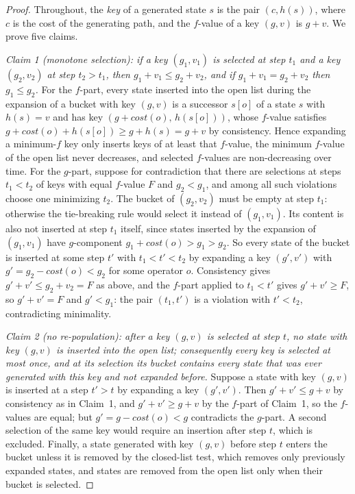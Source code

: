 \documentclass[letterpaper]{article}
\newcommand{\cost}{\ensuremath{\mathit{cost}}}
\theoremstyle{plain}
\theoremstyle{definition}
\theoremstyle{remark}
\begin{document}
\begin{proof}
Throughout, the \emph{key} of a generated state $s$ is the pair
$(c, h(s))$, where $c$ is the cost of the generating path, and the
$f$-value of a key $(g,v)$ is $g + v$. We prove five claims.

\emph{Claim 1 (monotone selection): if a key $(g_1,v_1)$ is selected at
step $t_1$ and a key $(g_2,v_2)$ at step $t_2 > t_1$, then
$g_1 + v_1 \leq g_2 + v_2$, and if $g_1 + v_1 = g_2 + v_2$ then
$g_1 \leq g_2$.}
For the $f$-part, every state inserted into the open list during the
expansion of a bucket with key $(g,v)$ is a successor $s[o]$ of a state
$s$ with $h(s) = v$ and has key $(g + \cost(o),\, h(s[o]))$, whose
$f$-value satisfies
$g + \cost(o) + h(s[o]) \geq g + h(s) = g + v$ by consistency. Hence
expanding a minimum-$f$ key only inserts keys of at least that
$f$-value, the minimum $f$-value of the open list never decreases, and
selected $f$-values are non-decreasing over time. For the $g$-part,
suppose for contradiction that there are selections at steps
$t_1 < t_2$ of keys with equal $f$-value $F$ and $g_2 < g_1$, and among
all such violations choose one minimizing $t_2$. The bucket of
$(g_2,v_2)$ must be empty at step $t_1$: otherwise the tie-breaking
rule would select it instead of $(g_1,v_1)$. Its content is also not
inserted at step $t_1$ itself, since states inserted by the expansion
of $(g_1,v_1)$ have $g$-component $g_1 + \cost(o) > g_1 > g_2$. So
every state of the bucket is inserted at some step $t'$ with
$t_1 < t' < t_2$ by expanding a key $(g',v')$ with
$g' = g_2 - \cost(o) < g_2$ for some operator $o$. Consistency gives
$g' + v' \leq g_2 + v_2 = F$ as above, and the $f$-part applied to
$t_1 < t'$ gives $g' + v' \geq F$, so $g' + v' = F$ and $g' < g_1$:
the pair $(t_1, t')$ is a violation with $t' < t_2$, contradicting
minimality.

\emph{Claim 2 (no re-population): after a key $(g,v)$ is selected at
step $t$, no state with key $(g,v)$ is inserted into the open list;
consequently every key is selected at most once, and at its selection
its bucket contains every state that was ever generated with this key
and not expanded before.}
Suppose a state with key $(g,v)$ is inserted at a step $t' > t$ by
expanding a key $(g',v')$. Then $g' + v' \leq g + v$ by consistency as
in Claim~1, and $g' + v' \geq g + v$ by the $f$-part of Claim~1, so the
$f$-values are equal; but $g' = g - \cost(o) < g$ contradicts the
$g$-part. A second selection of the same key would require an
insertion after step $t$, which is excluded. Finally, a state generated
with key $(g,v)$ before step $t$ enters the bucket unless it is removed
by the closed-list test, which removes only previously expanded states,
and states are removed from the open list only when their bucket is
selected.


\end{proof}
\end{document}
